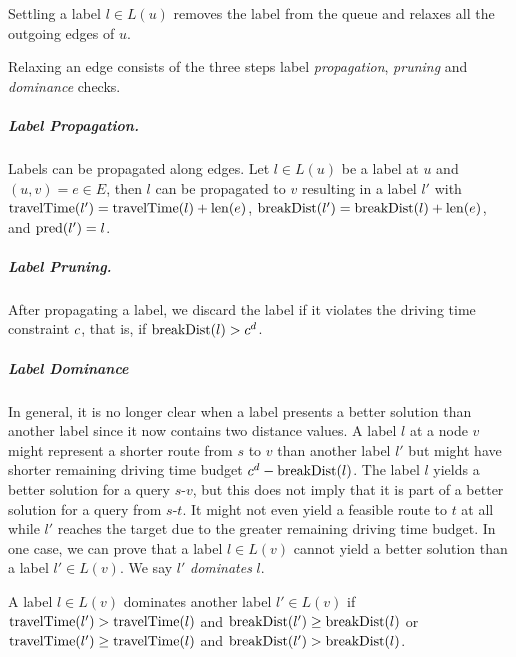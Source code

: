 \begin{algorithm}[hbtp]
	\DontPrintSemicolon


	\caption[\textsc{SettleNextLabel}]{\label{alg:settle_next_label}Settling a label $l \in L(u)$ removes the label from the queue and relaxes all the outgoing edges of $u$.}
\end{algorithm}


Relaxing an edge consists of the three steps label \emph{propagation}, \emph{pruning} and \emph{dominance} checks.

\subparagraph{Label Propagation.}
Labels can be propagated along edges. Let $l \in L(u)$ be a label at $u$ and $(u,v) = e \in E$, then $l$ can be propagated to $v$ resulting in a label $l'$ with $\operatorname{travelTime}(l') = \operatorname{travelTime}(l) + \operatorname{len}(e)$, $\operatorname{breakDist}(l') = \operatorname{breakDist}(l) + \operatorname{len}(e)$, and $\operatorname{pred}(l') = l$.

\subparagraph{Label Pruning.}
After propagating a label, we discard the label if it violates the driving time constraint $c$, that is, if $\operatorname{breakDist}(l) > c^d$.


\subparagraph{Label Dominance}
In general, it is no longer clear when a label presents a better solution than another label since it now contains two distance values. A label $l$ at a node $v$ might represent a shorter route from $s$ to $v$ than another label $l'$ but might have shorter remaining driving time budget $c^d - \operatorname{breakDist}(l)$. The label $l$ yields a better solution for a query $s$-$v$, but this does not imply that it is part of a better solution for a query from $s$-$t$. It might not even yield a feasible route to $t$ at all while $l'$ reaches the target due to the greater remaining driving time budget. In one case, we can prove that a label $l \in L(v)$ cannot yield a better solution than a label $l' \in L(v)$. We say $l'$ \emph{dominates} $l$.

\begin{definition}
	A label $l \in L(v)$ dominates another label $l' \in L(v)$ if $\operatorname{travelTime}(l') > \operatorname{travelTime}(l)$ and $\operatorname{breakDist}(l') \ge \operatorname{breakDist}(l)$ or $\operatorname{travelTime}(l') \ge \operatorname{travelTime}(l)$ and $\operatorname{breakDist}(l') > \operatorname{breakDist}(l)$.
\end{definition}

